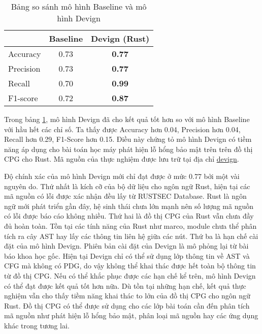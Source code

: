 \begin{table}[H]
    \centering
    \caption{Bảng so sánh mô hình Baseline và mô hình Devign}
    \label{table:c5_ml}
    \begin{tabular}{l @{\hskip 3cm} c @{\hskip 3cm} c}
        \hline
         & Baseline & \textbf{Devign (Rust)} \\
        \hline
        Accuracy & 0.73 & \textbf{0.77} \\
        Precision & 0.73 & \textbf{0.77} \\
        Recall & 0.70 & \textbf{0.99} \\
        F1-score & 0.72 & \textbf{0.87} \\
        \hline
    \end{tabular}
\end{table}

Trong bảng \ref{table:c5_ml}, mô hình Devign đã cho kết quả tốt hơn so với mô hình Baseline với hầu hết các chỉ số.
Ta thấy được Accuracy hơn 0.04, Precision hơn 0.04, Recall hơn 0.29, F1-Score hơn 0.15.
Điều này chứng tỏ mô hình Devign có tiềm năng áp dụng cho bài toán học máy phát hiện lỗ hổng bảo mật trên trên đồ thị CPG cho Rust.
Mã nguồn của thực nghiệm được lưu trữ tại địa chỉ \href{https://github.com/congnghiahieu/devign}{devign}.

Độ chính xác của mô hình Devign mới chỉ đạt được ở mức 0.77 bởi một vài nguyên do.
Thứ nhất là kích cỡ của bộ dữ liệu cho ngôn ngữ Rust, hiện tại các mã nguồn có lỗi được xác nhận đều lấy từ RUSTSEC Database.
Rust là ngôn ngữ mới phát triển gần đây, hệ sinh thái chưa lớn mạnh nên số lượng mã nguồn có lỗi được báo cáo không nhiều.
Thứ hai là đồ thị CPG của Rust vẫn chưa đầy đủ hoàn toàn.
Tồn tại các tính năng của Rust như marco, module chưa thể phân tích ra cây AST hay lấy các thông tin liên hệ giữa các nút.
Thứ ba là hạn chế cài đặt của mô hình Devign.
Phiên bản cài đặt của Devign là mô phỏng lại từ bài báo khoa học gốc.
Hiện tại Devign chỉ có thể sử dụng lớp thông tin về AST và CFG mà không có PDG, do vậy không thể khai thác được hết toàn bộ thông tin từ đồ thị CPG.
Nếu có thể khắc phục được các hạn chế kể trên, mô hình Devign có thể đạt được kết quả tốt hơn nữa.
Dù tồn tại những hạn chế, kết quả thực nghiệm vẫn cho thấy tiềm năng khai thác to lớn của đồ thị CPG cho ngôn ngữ Rust.
Đồ thị CPG có thể được sử dụng cho các lớp bài toán cần đến phân tích mã nguồn như phát hiện lỗ hổng bảo mật, phân loại mã nguồn hay các ứng dụng khác trong tương lai.

